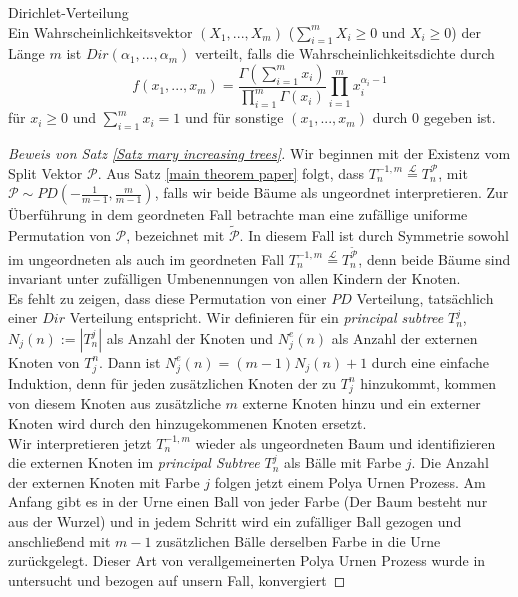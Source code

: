 \begin{Definition}\textnormal{Dirichlet-Verteilung}\\
    Ein Wahrscheinlichkeitsvektor $(X_1,...,X_m)$ ($\sum_{i=1}^{m} X_i \geq 0$ und $X_i \geq 0$) der Länge $m$ ist $Dir(\alpha_1,...,\alpha_m)$ verteilt, falls die Wahrscheinlichkeitsdichte durch
    \[
    f(x_1,...,x_m) = \frac{\Gamma(\sum_{i=1}^{m}x_i)}{\prod_{i=1}^{m}\Gamma(x_i)} \prod_{i=1}^{m}x_i^{\alpha_i-1}
    \] 
    für $x_i \geq 0$ und $\sum_{i=1}^{m}x_i = 1$ und für sonstige $(x_1,...,x_m)$ durch $0$ gegeben ist.
\end{Definition}
\begin{proof}[Beweis von Satz \ref{Satz mary increasing trees}]
    Wir beginnen mit der Existenz vom Split Vektor $\mathcal{P}$.  Aus Satz \ref{main theorem paper} folgt, dass $T_n^{-1,m} \stackrel{\mathcal{L}}{=}T_n^{\mathcal{P}}$, mit $\mathcal{P} \sim PD(-\frac{1}{m-1},\frac{m}{m-1})$, falls wir beide Bäume als ungeordnet interpretieren. Zur Überführung in dem geordneten Fall betrachte man eine zufällige uniforme Permutation von $\mathcal{P}$, bezeichnet mit $\tilde{\mathcal{P}}$. In diesem Fall ist durch Symmetrie sowohl im ungeordneten als auch im geordneten Fall $T_n^{-1,m} \stackrel{\mathcal{L}}{=}T_n^{\tilde{\mathcal{P}}}$, denn beide Bäume sind invariant unter zufälligen Umbenennungen von allen Kindern der Knoten. \\
    Es fehlt zu zeigen, dass diese Permutation von einer $PD$ Verteilung, tatsächlich einer $Dir$ Verteilung entspricht. Wir definieren für ein \textit{principal subtree} $T^j_n$, $N_j(n) := |T^j_n|$ als Anzahl der Knoten und $N_j^e(n)$ als Anzahl der externen Knoten von $T_j^n$. Dann ist $N_j^e(n) = (m-1)N_j(n) + 1$ durch eine einfache Induktion, denn für jeden zusätzlichen Knoten der zu $T_j^n$ hinzukommt, kommen von diesem Knoten aus zusätzliche $m$ externe Knoten hinzu und ein externer Knoten wird durch den hinzugekommenen Knoten ersetzt. \\
    Wir interpretieren jetzt $T_n^{-1,m}$ wieder als ungeordneten Baum und identifizieren die externen Knoten im \textit{principal Subtree} $T^j_n$ als Bälle mit Farbe $j$. Die Anzahl der externen Knoten mit Farbe $j$ folgen jetzt einem Polya Urnen Prozess. Am Anfang gibt es in der Urne einen Ball von jeder Farbe (Der Baum besteht nur aus der Wurzel) und in jedem Schritt wird ein zufälliger Ball gezogen und anschließend mit $m-1$ zusätzlichen Bälle derselben Farbe in die Urne zurückgelegt.  Dieser Art von verallgemeinerten Polya Urnen Prozess wurde in \cite{athreya1969characteristic} untersucht und bezogen auf unsern Fall, konvergiert

\end{proof}
